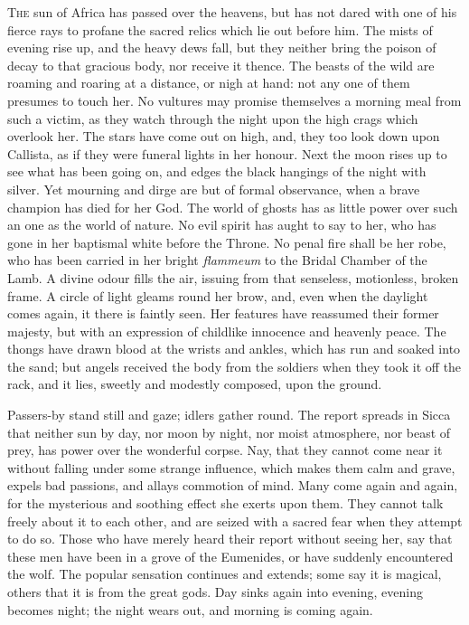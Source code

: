T\textsc{he} sun of Africa has passed over the heavens, but has not
dared with one of his fierce rays to profane the sacred relics which
lie out before him. The mists of evening rise up, and the heavy dews
fall, but they neither bring the poison of decay to that gracious
body, nor receive it thence. The beasts of the wild are roaming and
roaring at a distance, or nigh at hand: not any one of them presumes
to touch her. No vultures may promise themselves a morning meal from
such a victim, as they watch through the night upon the high crags
which overlook her. The stars have come out on high, and, they too
look down upon Callista, as if they were funeral lights in her honour.
Next the moon rises up to see what has been going on, and edges the
black hangings of the night with silver. Yet mourning and dirge are
but of formal observance, when a brave champion has died for her God.
The world of ghosts has as little power over such an one as the world
of nature. No evil spirit has aught to say to her, who has gone in her
baptismal white before the Throne. No penal fire shall be her
robe, who has been carried in her bright \emph{flammeum} to the Bridal
Chamber of the Lamb. A divine odour fills the air, issuing from that
senseless, motionless, broken frame. A circle of light gleams round
her brow, and, even when the daylight comes again, it there is faintly
seen. Her features have reassumed their former majesty, but with an
expression of childlike innocence and heavenly peace. The thongs have
drawn blood at the wrists and ankles, which has run and soaked into
the sand; but angels received the body from the soldiers when they
took it off the rack, and it lies, sweetly and modestly composed, upon
the ground.

Passers-by stand still and gaze; idlers gather round. The report
spreads in Sicca that neither sun by day, nor moon by night, nor moist
atmosphere, nor beast of prey, has power over the wonderful corpse.
Nay, that they cannot come near it without falling under some strange
influence, which makes them calm and grave, expels bad passions, and
allays commotion of mind. Many come again and again, for the
mysterious and soothing effect she exerts upon them. They cannot talk
freely about it to each other, and are seized with a sacred fear when
they attempt to do so. Those who have merely heard their report
without seeing her, say that these men have been in a grove of the
Eumenides, or have suddenly encountered the wolf. The popular
sensation continues and extends; some say it is magical, others that
it is from the great gods. Day sinks again into evening, evening becomes night; the night wears out, and morning is coming again.

